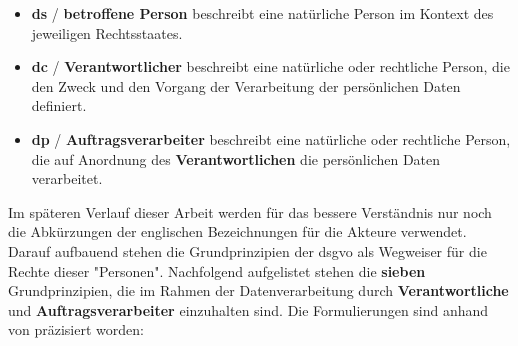 \begin{itemize}
    \item \textbf{\acl{ds}} / \textbf{betroffene Person} beschreibt eine natürliche Person im Kontext des jeweiligen Rechtsstaates.
    \item \textbf{\acl{dc}} / \textbf{Verantwortlicher} beschreibt eine natürliche oder rechtliche Person, die den Zweck und den Vorgang der Verarbeitung der persönlichen Daten definiert.
    \item \textbf{\acl{dp}} / \textbf{Auftragsverarbeiter} beschreibt eine natürliche oder rechtliche Person, die auf Anordnung des \textbf{Verantwortlichen} die persönlichen Daten verarbeitet.
\end{itemize}

\noindent Im späteren Verlauf dieser Arbeit werden für das bessere Verständnis nur noch die Abkürzungen der englischen Bezeichnungen für die Akteure verwendet. Darauf aufbauend stehen die Grundprinzipien der \ac{dsgvo} als Wegweiser für die Rechte dieser "Personen". 
Nachfolgend aufgelistet stehen die \textbf{sieben} Grundprinzipien, die im Rahmen der Datenverarbeitung durch \textbf{Verantwortliche} und \textbf{Auftragsverarbeiter} einzuhalten sind. Die Formulierungen sind anhand von \cite{DSGVOArt5} präzisiert worden:

